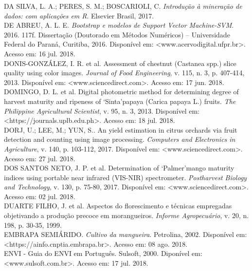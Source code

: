 \noindent DA SILVA, L. A.; PERES, S. M.; BOSCARIOLI, C. \textit{Introdução à mineração de dados: com aplicações em R}. Elsevier Brasil, 2017.
\\

\noindent DE ABREU, A. L. E. \textit{Bootstrap e modelos de Support Vector Machine-SVM}. 2016. 117f. Dissertação (Doutorado em Métodos Numéricos) – Universidade Federal do Paraná, Curitiba, 2016. Disponível em: <www.acervodigital.ufpr.br>. Acesso em: 16 jul. 2018.
\\

\noindent DONIS-GONZÁLEZ, I. R. et al. Assessment of chestnut (Castanea spp.) slice quality using color images. \textit{Journal of Food Engineering}, v. 115, n. 3, p. 407-414, 2013. Disponível em: <www.sciencedirect.com>. Acesso em: 17 jun. 2018.
\\

\noindent DOMINGO, D. L. et al. Digital photometric method for determining degree of harvest maturity and ripeness of ‘Sinta’papaya (Carica papaya L.) fruits. \textit{The Philippine Agricultural Scientist}, v. 95, n. 3, 2013. Disponível em: <https://journals.uplb.edu.ph>. Acesso em: 18 jul. 2018.
\\

\noindent DORJ, U.; LEE, M.; YUN, S.. An yield estimation in citrus orchards via fruit detection and counting using image processing. \textit{Computers and Electronics in Agriculture}, v. 140, p. 103-112, 2017. Disponível em: <www.sciencedirect.com>. Acesso em: 27 jul. 2018.
\\

\noindent DOS SANTOS NETO, J. P. et al. Determination of ‘Palmer’mango maturity indices using portable near infrared (VIS-NIR) spectrometer. \textit{Postharvest Biology and Technology}, v. 130, p. 75-80, 2017. Disponível em: <www.sciencedirect.com>. Acesso em: 02 jul. 2018. 
\\

\noindent DUARTE FILHO, J. et al. Aspectos do florescimento e técnicas empregadas objetivando a produção precoce em morangueiros. \textit{Informe Agropecuário}, v. 20, n. 198, p. 30-35, 1999. 
\\

\noindent EMBRAPA SEMIÁRIDO. \textit{Cultivo da mangueira}. Petrolina, 2002. Disponível em: \\ <https://ainfo.cnptia.embrapa.br>. Acesso em: 08 ago. 2018.
\\

\noindent ENVI - Guia do ENVI em Português. Sulsoft, 2000. Diponível em: <www.sulsoft.com.br>. Acesso em: 17 jul. 2018.
\\


